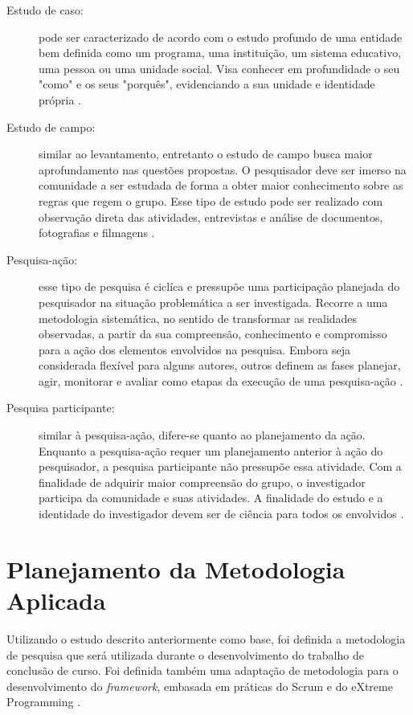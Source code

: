 \begin{description}
\item[Estudo de caso:] pode ser caracterizado de acordo com o estudo profundo de uma entidade bem definida como um programa, uma instituição, um sistema educativo, uma pessoa ou uma unidade social. Visa conhecer em profundidade o seu "como" e os seus "porquês", evidenciando a sua unidade e identidade própria \cite{prodanov2013}. 

\item[Estudo de campo:] similar ao levantamento, entretanto o estudo de campo busca maior aprofundamento nas questões propostas. O pesquisador deve ser imerso na comunidade a ser estudada de forma a obter maior conhecimento sobre as regras que regem o grupo. Esse tipo de estudo pode ser realizado com observação direta das atividades, entrevistas e análise de documentos, fotografias e filmagens \cite{tafner2007}.

\item[Pesquisa-ação:] esse tipo de pesquisa é ciclíca e pressupõe uma participação planejada do pesquisador na situação problemática a ser investigada. Recorre a uma metodologia sistemática, no sentido de transformar as realidades observadas, a partir da sua compreensão, conhecimento e compromisso para a ação dos elementos envolvidos na pesquisa\cite{thiollent2009}. Embora seja considerada flexível para alguns autores, outros definem as fases planejar, agir, monitorar e avaliar como etapas da execução de uma pesquisa-ação \cite{ferreira2011}. 

\item[Pesquisa participante:] similar à pesquisa-ação, difere-se quanto ao planejamento da ação. Enquanto a pesquisa-ação requer um planejamento anterior à ação do pesquisador, a pesquisa participante não pressupõe essa atividade. Com a finalidade de adquirir maior compreensão do grupo, o investigador participa da comunidade e suas atividades. A finalidade do estudo e a identidade do investigador devem ser de ciência para todos os envolvidos \cite{tafner2007}.
\end{description}

 \section{Planejamento da Metodologia Aplicada}
  
Utilizando o estudo descrito anteriormente como base, foi definida a metodologia de pesquisa que será utilizada durante o desenvolvimento do trabalho de conclusão de curso.  Foi definida também uma adaptação de metodologia para o desenvolvimento do \textit{framework}, embasada em práticas do Scrum \cite{scrum2014} e do eXtreme Programming \cite{wells2009}.  
  
